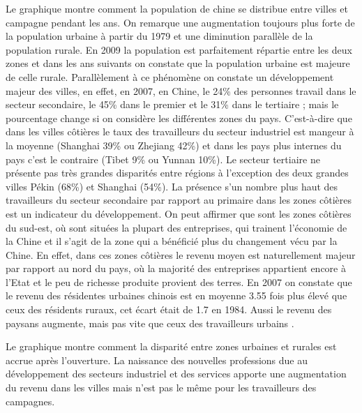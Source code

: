 Le graphique montre comment la population de chine se distribue entre villes et campagne pendant les ans. On remarque une augmentation toujours plus forte de la population urbaine à partir du 1979 et une diminution parallèle de la population rurale. En 2009 la population est parfaitement répartie entre les deux zones et dans les ans suivants on constate que la population urbaine est majeure de celle rurale.
Parallèlement à ce phénomène on constate un développement majeur des villes, en effet, en 2007, en Chine, le 24\% des personnes travail dans le secteur secondaire, le 45\% dans le premier et le 31\% dans le tertiaire ; mais le pourcentage change si on considère les différentes zones du pays.  C’est-à-dire que dans les villes côtières le taux des travailleurs du secteur industriel est mangeur à la moyenne (Shanghai 39\% ou Zhejiang 42\%) et dans les pays plus internes du pays c’est le contraire (Tibet 9\% ou Yunnan 10\%). Le secteur tertiaire ne présente pas très grandes disparités entre régions à l’exception des deux grandes villes Pékin (68\%) et Shanghai (54\%).  La présence s’un nombre plus haut des travailleurs du secteur secondaire par rapport au primaire dans les zones côtières est un indicateur du développement. 
On peut affirmer que sont les zones côtières du sud-est, où sont situées la plupart des entreprises, qui trainent l’économie de la Chine et il s’agit de la zone qui a bénéficié plus du changement vécu par la Chine.  En effet, dans ces zones côtières le revenu moyen est naturellement majeur par rapport au nord du pays, où la majorité des entreprises appartient encore à l’Etat et le peu de richesse produite provient des terres.  En 2007 on constate que le revenu des résidentes urbaines chinois est en moyenne 3.55 fois plus élevé que ceux des résidents ruraux, cet écart était de 1.7 en 1984.  Aussi le revenu des paysans augmente, mais pas vite que ceux des travailleurs urbains .

Le graphique montre comment la disparité entre zones urbaines et rurales est accrue après l’ouverture. La naissance des nouvelles professions due au développement des secteurs industriel et des services apporte une augmentation du revenu dans les villes mais n’est pas le même pour les travailleurs des campagnes. 
